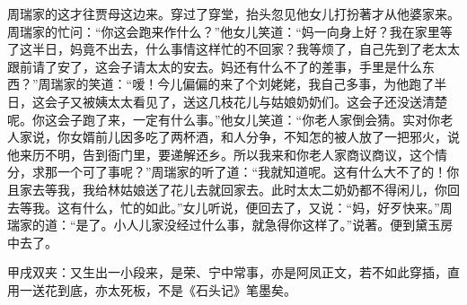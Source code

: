 \begin{parag}
    周瑞家的这才往贾母这边来。穿过了穿堂，抬头忽见他女儿打扮著才从他婆家来。周瑞家的忙问：“你这会跑来作什么？”他女儿笑道：“妈一向身上好？我在家里等了这半日，妈竟不出去，什么事情这样忙的不回家？我等烦了，自己先到了老太太跟前请了安了，这会子请太太的安去。妈还有什么不了的差事，手里是什么东西？”周瑞家的笑道：“嗳！今儿偏偏的来了个刘姥姥，我自己多事，为他跑了半日，这会子又被姨太太看见了，送这几枝花儿与姑娘奶奶们。这会子还没送清楚呢。你这会子跑了来，一定有什么事。”他女儿笑道：“你老人家倒会猜。实对你老人家说，你女婿前儿因多吃了两杯酒，和人分争，不知怎的被人放了一把邪火，说他来历不明，告到衙门里，要递解还乡。所以我来和你老人家商议商议，这个情分，求那一个可了事呢？”周瑞家的听了道：“我就知道呢。这有什么大不了的！你且家去等我，我给林姑娘送了花儿去就回家去。此时太太二奶奶都不得闲儿，你回去等我。这有什么，忙的如此。”女儿听说，便回去了，又说：“妈，好歹快来。”周瑞家的道：“是了。小人儿家没经过什么事，就急得你这样了。”说著。便到黛玉房中去了。\begin{note}甲戌双夹：又生出一小段来，是荣、宁中常事，亦是阿凤正文，若不如此穿插，直用一送花到底，亦太死板，不是《石头记》笔墨矣。\end{note}
\end{parag}


